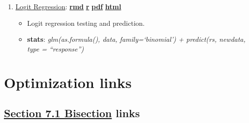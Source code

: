 \documentclass[
]{book}
\providecommand{\tightlist}{%
  \setlength{\itemsep}{0pt}\setlength{\parskip}{0pt}}
\begin{document}
\begin{enumerate}
\def\labelenumi{\arabic{enumi}.}
\tightlist
\item
  \href{https://fanwangecon.github.io/R4Econ/regnonlin/logit/htmlpdfr/fs_logit_birhs.html}{Logit Regression}: \href{https://github.com/FanWangEcon/R4Econ/blob/master/regnonlin/logit//fs_logit_birhs.Rmd}{\textbf{rmd}} \textbar{} \href{https://github.com/FanWangEcon/R4Econ/blob/master/regnonlin/logit/htmlpdfr/fs_logit_birhs.R}{\textbf{r}} \textbar{} \href{https://github.com/FanWangEcon/R4Econ/blob/master/regnonlin/logit/htmlpdfr/fs_logit_birhs.pdf}{\textbf{pdf}} \textbar{} \href{https://fanwangecon.github.io/R4Econ/regnonlin/logit/htmlpdfr/fs_logit_birhs.html}{\textbf{html}}

  \begin{itemize}
  \tightlist
  \item
    Logit regression testing and prediction.
  \item
    \textbf{stats}: \emph{glm(as.formula(), data, family=`binomial') + predict(rs, newdata, type = ``response'')}
  \end{itemize}
\end{enumerate}

\hypertarget{optimization-links}{%
\section{Optimization links}\label{optimization-links}}

\hypertarget{section-7.1-bisectionbisection-links}{%
\subsection{\texorpdfstring{\protect\hyperlink{bisection-1}{Section 7.1 Bisection} links}{Section 7.1 Bisection links}}\label{section-7.1-bisectionbisection-links}}
\end{document}
